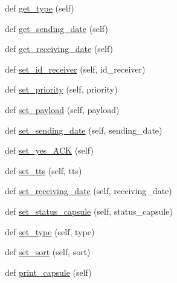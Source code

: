 \begin{DoxyCompactItemize}
\item 
def \hyperlink{classorg_1_1swallow__labs_1_1model_1_1_capsule_1_1_capsule_af4126ebec9c7122e7c9ba99b0531a828}{get\+\_\+type} (self)
\item 
def \hyperlink{classorg_1_1swallow__labs_1_1model_1_1_capsule_1_1_capsule_a34c70dde328ea1983943f21d9658a8f0}{get\+\_\+sending\+\_\+date} (self)
\item 
def \hyperlink{classorg_1_1swallow__labs_1_1model_1_1_capsule_1_1_capsule_ac3f5d9549b3516807effeae9f7a99ec4}{get\+\_\+receiving\+\_\+date} (self)
\item 
def \hyperlink{classorg_1_1swallow__labs_1_1model_1_1_capsule_1_1_capsule_a5e0cfce4a657f7d38c0a9d4c23111f74}{set\+\_\+id\+\_\+receiver} (self, id\+\_\+receiver)
\item 
def \hyperlink{classorg_1_1swallow__labs_1_1model_1_1_capsule_1_1_capsule_af9f6c1c82fca87610627c461aa2f1820}{set\+\_\+priority} (self, priority)
\item 
def \hyperlink{classorg_1_1swallow__labs_1_1model_1_1_capsule_1_1_capsule_ad715fd269e5947ab4a0e7a7cbdfd3a8e}{set\+\_\+payload} (self, payload)
\item 
def \hyperlink{classorg_1_1swallow__labs_1_1model_1_1_capsule_1_1_capsule_ae9b449f46a294d0b083adb6cdafbdf1a}{set\+\_\+sending\+\_\+date} (self, sending\+\_\+date)
\item 
def \hyperlink{classorg_1_1swallow__labs_1_1model_1_1_capsule_1_1_capsule_aae7896b127c66d8d03edfe872a110b1c}{set\+\_\+yes\+\_\+\+A\+C\+K} (self)
\item 
def \hyperlink{classorg_1_1swallow__labs_1_1model_1_1_capsule_1_1_capsule_adac4153ec93d94d0f5a3f9dbf0c63faf}{set\+\_\+tts} (self, tts)
\item 
def \hyperlink{classorg_1_1swallow__labs_1_1model_1_1_capsule_1_1_capsule_a828ac5991545d04e362204b1b94d7811}{set\+\_\+receiving\+\_\+date} (self, receiving\+\_\+date)
\item 
def \hyperlink{classorg_1_1swallow__labs_1_1model_1_1_capsule_1_1_capsule_a0375f0a9360d53d530bcc11759896dcd}{set\+\_\+status\+\_\+capsule} (self, status\+\_\+capsule)
\item 
def \hyperlink{classorg_1_1swallow__labs_1_1model_1_1_capsule_1_1_capsule_ab5070f98b5fe7c6ceb99e733f8862e77}{set\+\_\+type} (self, type)
\item 
def \hyperlink{classorg_1_1swallow__labs_1_1model_1_1_capsule_1_1_capsule_a067aa9fc0f35d5b83b804a6fd8c16d46}{set\+\_\+sort} (self, sort)
\item 
def \hyperlink{classorg_1_1swallow__labs_1_1model_1_1_capsule_1_1_capsule_a14153dfdf3e924bf7c84f13dba57e808}{print\+\_\+capsule} (self)
\end{DoxyCompactItemize}
